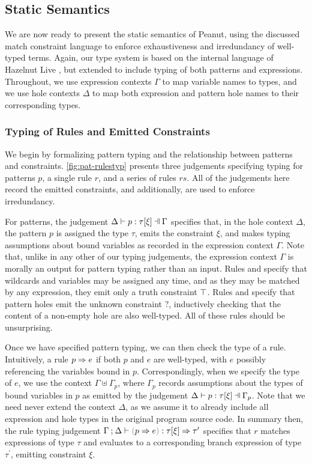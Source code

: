 \subsection{Static Semantics}\label{sec:statics}
 We are now ready to present the static semantics of Peanut, using the discussed match constraint language to enforce exhaustiveness and irredundancy of well-typed terms. Again, our type system is based on the internal language of Hazelnut Live \cite{DBLP:journals/pacmpl/OmarVCH19}, but extended to include typing of both patterns and expressions. Throughout, we use expression contexts $\Gamma$ to map variable names to types, and we use hole contexts $\Delta$ to map both expression and pattern hole names to their corresponding types.
 
 
  
 \pagebreak
 
 \subsubsection{Typing of Rules and Emitted Constraints}
 We begin by formalizing pattern typing and the relationship between patterns and constraints. \autoref{fig:pat-rulestyp} presents three judgements specifying typing for patterns $p$, a single rule $r$, and a series of rules $rs$. All of the judgements here record the emitted constraints, and additionally, are used to enforce irredundancy.
 
 For patterns, the judgement $\chpattyp{p}{\tau}{\xi}{\Gamma}{\Delta}$ specifies that, in the hole context $\Delta$, the pattern $p$ is assigned the type $\tau$, emits the constraint $\xi$, and makes typing assumptions about bound variables as recorded in the expression context $\Gamma$. Note that, unlike in any other of our typing judgements, the expression context $\Gamma$ is morally an output for pattern typing rather than an input. Rules \PTVar and \PTWild specify that wildcards and variables may be assigned any time, and as they may be matched by any expression, they emit only a truth constraint $\top$. Rules \PTEHole and \PTHole specify that pattern holes emit the unknown constraint $?$, inductively checking that the content of a non-empty hole are also well-typed. All of these rules should be unsurprising.
 
 Once we have specified pattern typing, we can then check the type of a rule. Intuitively, a rule $p \Rightarrow e$ if both $p$ and $e$ are well-typed, with $e$ possibly referencing the variables bound in $p$. Correspondingly, when we specify the type of $e$, we use the context $\Gamma \uplus \Gamma_p$, where $\Gamma_p$ records assumptions about the types of bound variables in $p$ as emitted by the judgement $\chpattyp{p}{\tau}{\xi}{\Gamma_p}{\Delta}$. Note that we need never extend the context $\Delta$, as we assume it to already include all expression and hole types in the original program source code. In summary then, the rule typing judgement $\chrultyp{\Gamma}{\Delta}{\hrulP{p}{e}}{\tau}{\xi}{\tau'}$ specifies that $r$ matches expressions of type $\tau$ and evaluates to a corresponding branch expression of type $\tau^\prime$, emitting constraint $\xi$.
 
